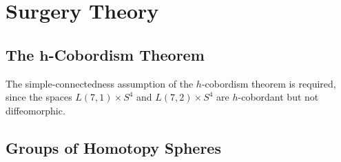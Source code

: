 \chapter{Surgery Theory}\label{sec:surgery-theory}

\section{The \texorpdfstring{$\bm{h}$}{h}-Cobordism Theorem}

\begin{theorem}[$h$-cobordism]
\end{theorem}

\begin{example}
  The simple-connectedness assumption of the $h$-cobordism theorem is required, since the spaces $L(7,1)\times S^4$ and $L(7,2)\times S^4$ are $h$-cobordant but not diffeomorphic.
\end{example}

\section{Groups of Homotopy Spheres}
